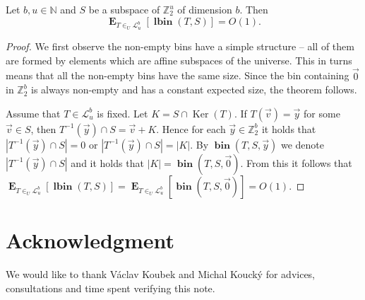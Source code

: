 \documentclass[unicode,review]{siamart1116}
\newcommand{\bin}[3]{\operatorname{\mathbf{bin}}({#1}, {#2}, {#3})}
\newcommand{\lbin}[2]{\operatorname{\mathbf{lbin}}({#1}, {#2})}
\newcommand{\vecspace}[2]{\mathbb{Z}_{#1}^{#2}}
\newcommand{\binvecspace}[1]{\vecspace{2}{#1}}
\newcommand{\linearmaps}[2]{\mathcal{L}_{#1}^{#2}}
\newcommand{\expects}[2]{\operatorname{\mathbf{E}}_{{#1}}\left[{#2}\right]}
\numberwithin{theorem}{section}
\begin{document}
\begin{theorem}
Let $b, u \in \mathbb{N}$ and $S$ be a subspace of $\binvecspace{u}$ of dimension $b$. Then \[ \expects{T \in_U \linearmaps{u}{b}}{\lbin{T}{S}} = O(1).\]
\end{theorem}
\begin{proof}
We first observe the non-empty bins have a simple structure -- all of them are formed by elements which are affine subspaces of the universe.
This in turns means that all the non-empty bins have the same size.
Since the bin containing $\vec{0}$ in $\binvecspace{b}$ is always non-empty and has a constant expected size, the theorem follows.

Assume that $T \in \linearmaps{u}{b}$ is fixed.
Let $K = S \cap \operatorname{Ker}(T)$.
If $T(\vec{v}) = \vec{y}$ for some $\vec{v} \in S$, then $T^{-1}(\vec y) \cap S = \vec v + K$.
Hence for each $\vec y \in \mathbb{Z}_2^b$ it holds that $|T^{-1}(\vec y) \cap S| = 0$ or $|T^{-1}(\vec y) \cap S| = |K|$.
By $\bin{T}{S}{\vec{y}}$ we denote $|T^{-1}(\vec{y}) \cap S|$ and it holds that $|K| = \bin{T}{S}{\vec 0}$.
From this it follows that 
$
\expects{T\in_U \linearmaps{u}{b}}{\lbin{T}{S}} = \expects{T\in_U \linearmaps{u}{b}}{\bin{T}{S}{\vec 0}} = O(1).
$

\end{proof}

\section{Acknowledgment}

We would like to thank V\'aclav Koubek and Michal Kouck\'y for advices, consultations and time spent verifying this note.



\end{document}
